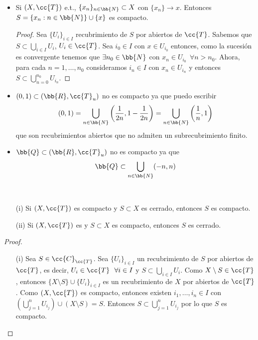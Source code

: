 \begin{ejemplo}\
    \begin{itemize}
        \item Si $(X, \cc{T})$ e.t., $\{x_n\}_{n\in \bb{N}}\subset X$ con $\{x_n\}\to x$. Entonces $S=\{x_n:n\in \bb{N}\}\cup\{x\}$ es compacto.
        \begin{proof}
            Sea $\{U_i\}_{i\in I}$ recubrimiento de $S$ por abiertos de $\cc{T}$. Sabemos que $S\subset \bigcup_{i\in I}U_i$, $U_i\in \cc{T}$. Sea $i_0\in I$ con $x\in U_{i_0}$ entonces, como la sucesión es convergente tenemos que $\exists n_0\in \bb{N}$ con $x_n\in U_{i_0}\ \ \forall n>n_0$. Ahora, para cada $n=1,\dots,n_0$ consideramos $i_n\in I$ con $x_n\in U_{i_n}$ y entonces $S\subset \bigcup_{n=0}^{n_0}U_{i_n}$.

        \end{proof}
        \item $(0,1)\subset (\bb{R}, \cc{T}_u)$ no es compacto ya que puedo escribir
        \begin{align*}
            (0,1)=\bigcup\limits_{n\in \bb{N}}\left(\frac{1}{2n}, 1 - \frac{1}{2n}\right) = \bigcup\limits_{n\in \bb{N}} \left(\frac{1}{n}, 1\right)
        \end{align*}
        que son recubrimientos abiertos que no admiten un subrecubrimiento finito.
        \item $\bb{Q}\subset (\bb{R}, \cc{T}_u)$ no es compacto ya que 
        \begin{align*}
            \bb{Q}\subset \bigcup\limits_{n\in \bb{N}}(-n,n)
        \end{align*}
    \end{itemize}
\end{ejemplo}

\begin{prop}\
    \begin{enumerate}
        \item[(i)] Si $(X, \cc{T})$ es compacto y $S\subset X$ es cerrado, entonces $S$ es compacto.
        \item[(ii)] Si $(X, \cc{T})$ es  y $S\subset X$ es compacto, entonces $S$ es cerrado.
    \end{enumerate}

    \begin{proof}\
        \begin{enumerate}
            \item[(i)] Sea $S\in \cc{C}_{\cc{T}}$. Sea $\{U_i\}_{i\in I}$ un recubrimiento de $S$ por abiertos de $\cc{T}$, es decir, $U_i\in \cc{T}\ \ \forall i \in I$ y $S\subset \bigcup\limits_{i\in I}U_i$. Como $X\setminus S\in \cc{T}$, entonces $\{X\setminus S\}\cup\{U_i\}_{i\in I}$ es un recubrimiento de $X$ por abiertos de $\cc{T}$. Como $(X, \cc{T})$ es compacto, entonces existen $i_1,\dots,i_n\in I$ con $\left(\bigcup\limits_{j=1}^{n}U_{i_j}\right)\cup (X\setminus S)=S$. Entonces $S\subset \bigcup\limits_{j=1}^{n}U_{i_j}$ por lo que $S$ es compacto.
        \end{enumerate}
    \end{proof}
\end{prop}
